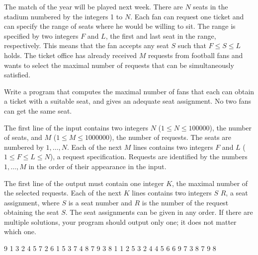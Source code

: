 

The match of the year will be played next week. There are $N$ seats in the stadium numbered by the integers 1 to $N$. Each fan can request one ticket and can specify the range of seats where he would be willing to sit. The range is specified by two integers $F$ and $L$, the first and last seat in the range, respectively. This means that the fan accepts any seat $S$ such that $F \leq S \leq L$ holds. The ticket office has already received $M$ requests from football fans and wants to select the maximal number of requests that can be simultaneously satisfied.

Write a program that computes the maximal number of fans that each can obtain a ticket with a suitable seat, and gives an adequate seat assignment. No two fans can get the same seat.

The first line of the input contains two integers $N$ ($1 \leq N \leq 100000$), the number of seats, and $M$ ($1 \leq M \leq 1000000$), the number of requests. The seats are numbered by $1,\ldots,N$. Each of the next $M$ lines contains two integers $F$ and $L$ ($1 \leq F \leq L \leq N$), a request specification. Requests are identified by the numbers $1,\ldots,M$ in the order of their appearance in the input.

The first line of the output must contain one integer $K$, the maximal number of the selected requests. Each of the next $K$ lines contains two integers $S$ $R$, a seat assignment, where $S$ is a seat number and $R$ is the number of the request obtaining the seat $S$. The seat assignments can be given in any order. If there are multiple solutions, your program should output only one; it does not matter which one.

 9
1 3
2 4
5 7
2 6
1 5
3 7
4 8
7 9
3 8
1 1
2 5
3 2
4 4
5 6
6 9
7 3
8 7
9 8
\sampleCOMMENT

\sampleEND
\bigskip

